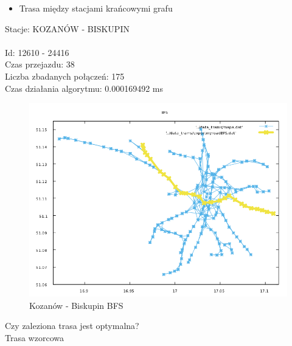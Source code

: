 \documentclass[13pt]{article}
\begin{document}
\newpage
\begin{itemize}
\item Trasa między stacjami krańcowymi grafu
\end{itemize}
\hspace{1.5cm}Stacje: KOZANÓW - BISKUPIN\\\\
Id: 12610   - 24416\\
Czas przejazdu: 38\\
Liczba zbadanych połączeń: 175\\
Czas działania algorytmu: 0.000169492 ms\\
\begin{figure}[hp]
\centering
\includegraphics[width=1\textwidth]{wykresy/KOZA_BIS_BFS.png}
\caption{Kozanów - Biskupin BFS}
\end{figure}

Czy zaleziona trasa jest optymalna?\\
Trasa wzorcowa
\end{document}

